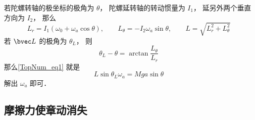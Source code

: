 若陀螺转轴的极坐标的极角为 $\theta$， 陀螺延转轴的转动惯量为 $I_1$， 延另外两个垂直方向为 $I_2$， 那么
\begin{equation}
L_r = I_1(\omega_0+\omega_a\cos\theta), \qquad
L_\theta = -I_2\omega_a\sin\theta, \qquad
L = \sqrt{L_r^2 + L_\theta^2}
\end{equation}
若 $\bvec L$ 的极角为 $\theta_L$， 则
\begin{equation}
\theta_L - \theta = \arctan\frac{L_\theta}{L_r}
\end{equation}
那么\autoref{TopNum_eq1} 就是
\begin{equation}
L\sin\theta_L \omega_a = Mga\sin\theta
\end{equation}
解出 $\omega_a$ 即可．

\subsection{摩擦力使章动消失}

